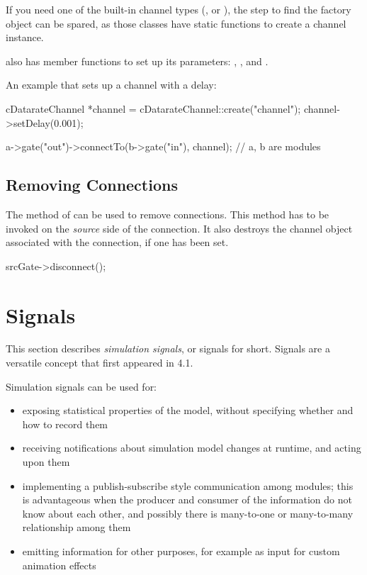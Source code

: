 If you need one of the built-in channel types (,
 or ), the step to find the
factory object can be spared, as those classes have static 
functions to create a channel instance.

 also has member functions to set up its
parameters: , ,
 and .

An example that sets up a channel with a delay:

\begin{cpp}
cDatarateChannel *channel = cDatarateChannel::create("channel");
channel->setDelay(0.001);

a->gate("out")->connectTo(b->gate("in"), channel); // a, b are modules
\end{cpp}


\subsection{Removing Connections}

The  method of  can be
used to remove connections. This method has to be invoked
on the \textit{source} side of the connection. It also destroys
the channel object associated with the connection, if one has been set.

\begin{cpp}
srcGate->disconnect();
\end{cpp}

\section{Signals}
\label{sec:simple-modules:signals}

This section describes \textit{simulation signals}, or signals for short.
Signals are a versatile concept that first appeared in {\opp} 4.1.

Simulation signals can be used for:

\begin{itemize}
  \item exposing statistical properties of the model, without specifying
        whether and how to record them
  \item receiving notifications about simulation model changes at runtime, and
        acting upon them
  \item implementing a publish-subscribe style communication among modules;
        this is advantageous when the producer and consumer of the information
        do not know about each other, and possibly there is many-to-one or
        many-to-many relationship among them
  \item emitting information for other purposes, for example as input for
        custom animation effects
\end{itemize}

